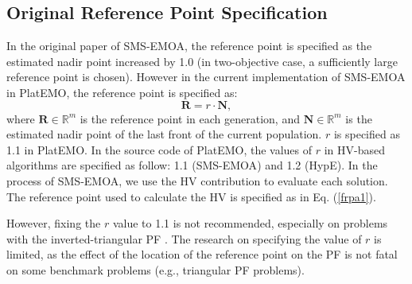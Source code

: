\documentclass[conference]{IEEEtran}
\begin{document}
\subsection{Original Reference Point Specification}
In the original paper of SMS-EMOA\cite{smsemoa}, 
the reference point is specified as the estimated nadir point increased by 1.0
(in two-objective case, a sufficiently large reference point is chosen). 
However in the current implementation of SMS-EMOA in PlatEMO\cite{PlatEMO}, the reference point is specified as:
\begin{equation}\label{frpa1}
  \boldsymbol R = r \cdot \boldsymbol N,  
\end{equation}
where $\boldsymbol R \in \mathbb{R}^m$ is the reference point in each generation, 
and $\boldsymbol N \in \mathbb{R}^m$ is the estimated nadir point of the last front of the current population. 
$r$ is specified as 1.1 in PlatEMO. 
In the source code of PlatEMO, the values of $r$ in HV-based algorithms are specified as follow: 
1.1 (SMS-EMOA\cite{smsemoa}) and 1.2 (HypE\cite{HypE}). %
In the process of SMS-EMOA,  
we use the HV contribution to evaluate each solution. 
The reference point used to calculate the HV is specified as in Eq. (\ref{frpa1}). 

However, fixing the $r$ value to 1.1 is not recommended, especially on problems with the inverted-triangular PF
\cite{hisao:RPhowtoSpecify}. 
The research on specifying the value of $r$ is limited, 
as the effect of the location of the reference point on the PF 
is not fatal on some benchmark problems (e.g., triangular PF problems). 

%
\end{document}
